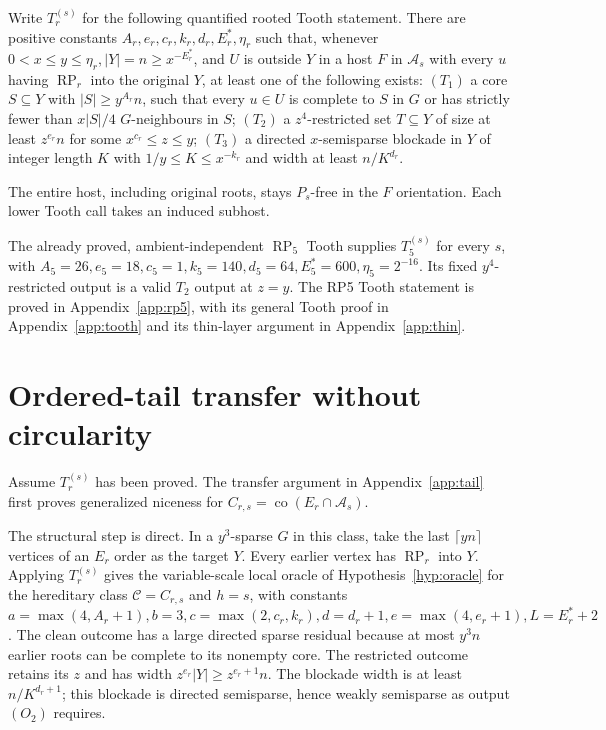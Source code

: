 \documentclass[11pt,a4paper]{article}
\theoremstyle{definition}
\theoremstyle{remark}
\numberwithin{equation}{section}
\DeclareMathOperator{\co}{co}
\begin{document}
Write \(T_{r}^{(s)}\) for the following quantified rooted Tooth statement. There are positive constants \(A_{r},\allowbreak e_{r},\allowbreak c_{r},\allowbreak k_{r},\allowbreak d_{r},\allowbreak E_{r}^{*},\allowbreak \eta_{r}\) such that, whenever \(0<x\le\allowbreak y\le\allowbreak \eta_{r},\allowbreak  |Y|=n\ge\allowbreak x^{-E_{r}^{*}}\), and \(U\) is outside \(Y\) in a host \(F\) in \(\mathcal{A}_{s}\) with every \(u\) having \(\operatorname{RP}_{r}\) into the original \(Y\), at least one of the following exists: \((T_{1})\) a core \(S\subseteq Y\) with \(|S|\ge y^{A_{r}} n\), such that every \(u\in U\) is complete to \(S\) in \(G\) or has strictly fewer than \(x|S|/4\) \(G\)-neighbours in \(S\); \((T_{2})\) a \(z^{4}\)-restricted set \(T\subseteq Y\) of size at least \(z^{e_{r}} n\) for some \(x^{c_{r}}\le\allowbreak z\le\allowbreak y\); \((T_{3})\) a directed \(x\)-semisparse blockade in \(Y\) of integer length \(K\) with \(1/y\le K\le x^{-k_{r}}\) and width at least \(n/K^{d_{r}}\).

The entire host, including original roots, stays \(P_{s}\)-free in the \(F\) orientation. Each lower Tooth call takes an induced subhost.

The already proved, ambient-independent \(\operatorname{RP}_{5}\) Tooth supplies \(T_{5}^{(s)}\) for every \(s\), with \(A_{5}=26,\allowbreak  e_{5}=18,\allowbreak  c_{5}=1,\allowbreak  k_{5}=140,\allowbreak  d_{5}=64,\allowbreak  E_{5}^{*}=600,\allowbreak  \eta_{5}=2^{-16}\). Its fixed \(y^{4}\)-restricted output is a valid \(T_{2}\) output at \(z=y\).
The RP5 Tooth statement is proved in Appendix~\ref{app:rp5}, with its general Tooth proof in Appendix~\ref{app:tooth} and its thin-layer argument in Appendix~\ref{app:thin}.

\section{Ordered-tail transfer without circularity}\label{sec:tail}
Assume \(T_{r}^{(s)}\) has been proved. The transfer argument in Appendix~\ref{app:tail} first proves generalized niceness for \(C_{r,s}=\co(E_{r}\cap\mathcal{A}_{s})\).

The structural step is direct. In a \(y^{3}\)-sparse \(G\) in this class, take the last \(\lceil yn\rceil\) vertices of an \(E_{r}\) order as the target \(Y\). Every earlier vertex has \(\operatorname{RP}_{r}\) into \(Y\). Applying \(T_{r}^{(s)}\) gives the variable-scale local oracle of Hypothesis~\ref{hyp:oracle} for the hereditary class \(\mathcal C=C_{r,s}\) and \(h=s\), with constants \(a=\max (4,\allowbreak A_{r}+1),\allowbreak  b=3,\allowbreak  c=\max (2,\allowbreak c_{r},\allowbreak k_{r}),\allowbreak  d=d_{r}+1,\allowbreak  e=\max (4,\allowbreak e_{r}+1),\allowbreak  L=E_{r}^{*}+2\). The clean outcome has a large directed sparse residual because at most \(y^{3} n\) earlier roots can be complete to its nonempty core. The restricted outcome retains its \(z\) and has width \(z^{e_{r}} |Y|\ge\allowbreak z^{e_{r}+1}n\). The blockade width is at least \(n/K^{d_{r}+1}\); this blockade is directed semisparse, hence weakly semisparse as output \((O_{2})\) requires.
\end{document}
